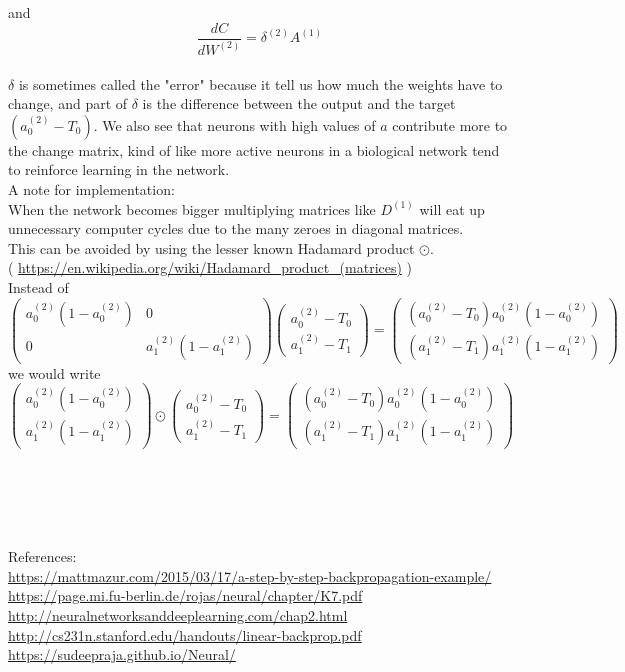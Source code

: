 \documentclass{article}
\begin{document}
and
\[
\frac{dC}{dW^{(2)}} = \delta^{(2)} A^{(1)} 
\]
\\
$\delta$ is sometimes called the "error" because it tell us how much the weights have to change, and part of $\delta$ is the difference between the output and the target $(a_{0}^{(2)}-T_0)$. We also see that neurons with high values of $a$ contribute more to the change matrix, kind of like more active neurons in a biological network tend to reinforce learning in the network.
\\
A note for implementation:
\\
When the network becomes bigger multiplying matrices like $D^{(1)}$ will eat up unnecessary computer cycles due to the many zeroes in diagonal matrices.
\\
This can be avoided by using the lesser known Hadamard product $\odot$. 
\\
( \url{https://en.wikipedia.org/wiki/Hadamard_product_(matrices)} )
\\
Instead of
\[
\begin{pmatrix}
a_{0}^{(2)}(1-a_{0}^{(2)}) & 0 \\
0 & a_{1}^{(2)}(1-a_{1}^{(2)})
\end{pmatrix}
\begin{pmatrix}
a_{0}^{(2)}-T_0 \\ a_{1}^{(2)}-T_1
\end{pmatrix} =
\begin{pmatrix}
(a_0^{(2)}-T_0)a_0^{(2)}(1-a_0^{(2)}) \\ (a_1^{(2)}-T_1)a_1^{(2)}(1-a_1^{(2)})
\end{pmatrix}
\]
we would write
\\
\[
\begin{pmatrix}
a_{0}^{(2)}(1-a_{0}^{(2)}) \\
a_{1}^{(2)}(1-a_{1}^{(2)})
\end{pmatrix}
\odot
\begin{pmatrix}
a_{0}^{(2)}-T_0 \\ a_{1}^{(2)}-T_1
\end{pmatrix} =
\begin{pmatrix}
(a_0^{(2)}-T_0)a_0^{(2)}(1-a_0^{(2)}) \\ (a_1^{(2)}-T_1)a_1^{(2)}(1-a_1^{(2)})
\end{pmatrix}
\]
\\
\\
\\
\\
\\
References: 
\\
\url{https://mattmazur.com/2015/03/17/a-step-by-step-backpropagation-example/}
\\
\url{https://page.mi.fu-berlin.de/rojas/neural/chapter/K7.pdf}
\\
\url{http://neuralnetworksanddeeplearning.com/chap2.html}
\\
\url{http://cs231n.stanford.edu/handouts/linear-backprop.pdf}
\\
\url{https://sudeepraja.github.io/Neural/}
\\
\end{document}
